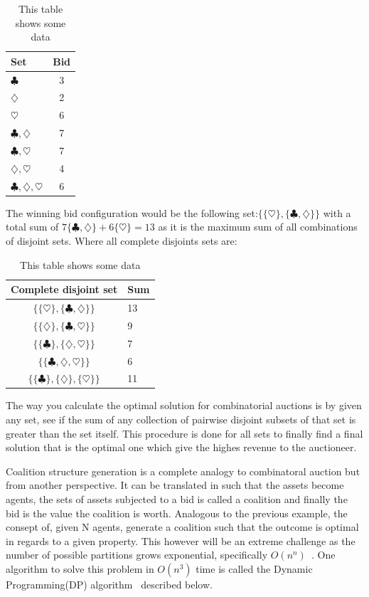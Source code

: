 \documentclass[a4paper, 12pt]{report}
\begin{document}
\begin{table}[htb]
\centering
\begin{tabular}{ l | c}
\hline  
Set & Bid \\
\hline
$\clubsuit$ & 3 \\
$\diamondsuit$ & 2 \\
$\heartsuit$ & 6 \\
$\clubsuit, \diamondsuit$ & 7 \\
$\clubsuit, \heartsuit$ & 7 \\
$\diamondsuit, \heartsuit$ & 4 \\
$\clubsuit, \diamondsuit, \heartsuit$ & 6 \\
\end{tabular}
\caption{This table shows some data}
\label{tab:myfirsttable}
\end{table}

The winning bid configuration would be the following set:$ \{\{\heartsuit\},\{\clubsuit , \diamondsuit\}\}$ with a total sum of $7 \{\clubsuit , \diamondsuit\}+6 \{\heartsuit\} = 13$ as it is the maximum sum of all combinations of disjoint sets. Where all complete disjoints sets are:

\begin{table}[htb]
\centering
\begin{tabular}{c | l }
\hline
Complete disjoint set & Sum\\
\hline
$\{\{\heartsuit \},\{\clubsuit , \diamondsuit \}\} $ & 13 \\
$\{\{\diamondsuit \},\{\clubsuit , \heartsuit \}\} $ & 9 \\
$\{\{\clubsuit \},\{\diamondsuit , \heartsuit \}\} $ & 7 \\

$\{\{\clubsuit,\diamondsuit , \heartsuit \}\} $ & 6 \\
$\{\{\clubsuit \},\{\diamondsuit \}, \{ \heartsuit \}\} $ &  11
\end{tabular}
\caption{This table shows some data}
\label{tab:myfirsttable}
\end{table}

The way you calculate the optimal solution for combinatorial auctions is by given any set, see if the sum of any collection of pairwise disjoint subsets of that set is greater than the set itself. This procedure is done for all sets to finally find a final solution that is the optimal one which give the highes revenue to the auctioneer.

Coalition structure generation is a complete analogy to combinatoral auction but from another perspective. It can be translated in such that the assets become agents, the sets of assets subjected to a bid is called a coalition and finally the bid is the value the coalition is worth. Analogous to the previous example,  the consept of, given N agents, generate a coalition such that the outcome is optimal in regards to a given property. This however will be an extreme challenge as the number of possible partitions grows exponential, specifically $O(n^n)$~\cite{rahwan2008improved}. One algorithm to solve this problem in $O(n^3)$ time is called the Dynamic Programming(DP) algorithm~\citep{rothkopf1998computationally} described below.
\end{document}
